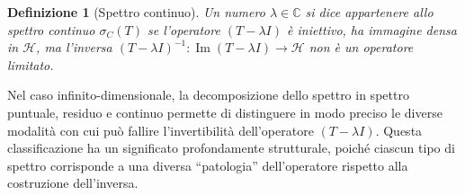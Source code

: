 \documentclass[a4paper,12pt]{report}
\newtheorem{definizione}{Definizione}[chapter]
\begin{document}
\begin{definizione}[Spettro continuo]
Un numero $\lambda \in \mathbb{C}$ si dice appartenere allo spettro continuo $\sigma_C(T)$ se l’operatore $(T-\lambda I)$ è iniettivo, ha immagine densa in $\mathscr{H}$, ma l’inversa $(T-\lambda I)^{-1} : \operatorname{Im}(T-\lambda I) \to \mathscr{H}$ non è un operatore limitato.
\end{definizione}

Nel caso infinito-dimensionale, la decomposizione dello spettro in spettro puntuale, residuo e continuo permette di distinguere in modo preciso le diverse modalità con cui può fallire l’invertibilità dell’operatore $(T-\lambda I)$. Questa classificazione ha un significato profondamente strutturale, poiché ciascun tipo di spettro corrisponde a una diversa “patologia” dell’operatore rispetto alla costruzione dell’inversa.
\end{document}
